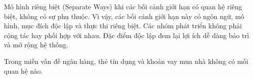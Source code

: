  Mô hình riêng biệt (Separate Ways) khi các bối cảnh giới hạn     có quan hệ riêng biệt, không có sự phụ thuộc. Vì vậy,  các   bối cảnh giới hạn   này     có  ngôn ngữ, mô hình, mục đích độc lập  và        thực thi riêng biệt.  Các nhóm phát triển không phải cộng tác hay phối hợp  với nhau.
Đặc điểm độc lập   đem lại lợi ích  dễ dàng bảo trì và mở rộng hệ thống.
\begin{example} Trong miền vấn đề ngân hàng,     thẻ tín dụng và khoản vay mua nhà không có mối quan hệ nào. 
    
\end{example} 
